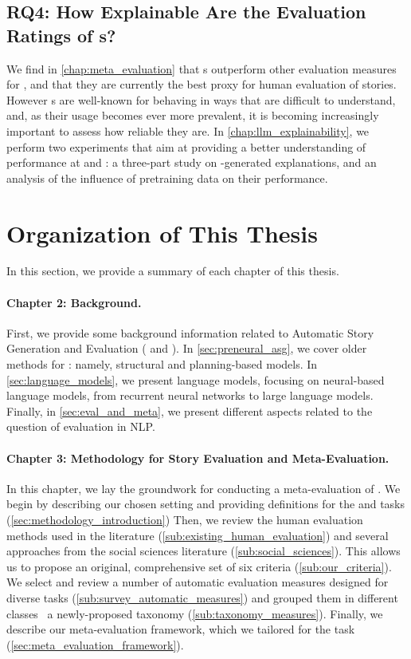 \subsection{RQ4: How Explainable Are the Evaluation Ratings of {\llmfull}s?}
We find in \autoref{chap:meta_evaluation} that {\llm}s outperform other evaluation measures for {\ase}, and that they are currently the best proxy for human evaluation of stories. However {\llm}s are well-known for behaving in ways that are difficult to understand, and, as their usage becomes ever more prevalent, it is becoming increasingly important to assess how reliable they are. In \autoref{chap:llm_explainability}, we perform two experiments that aim at providing a better understanding of {\llm} performance at {\ase} and {\asg}: a three-part study on {\llm}-generated explanations, and an analysis of the influence of pretraining data on their {\asg} performance.

\section{Organization of This Thesis}

In this section, we provide a summary of each chapter of this thesis.

\paragraph{Chapter 2: Background.}
First, we provide some background information related to Automatic Story Generation and Evaluation ({\asg} and {\ase}). In \autoref{sec:preneural_asg}, we cover older methods for {\asg}: namely, structural and planning-based models. In \autoref{sec:language_models}, we present language models, focusing on neural-based language models, from recurrent neural networks to large language models. Finally, in \autoref{sec:eval_and_meta}, we present different aspects related to the question of evaluation in NLP.

\paragraph{Chapter 3: Methodology for Story Evaluation and {\asg} Meta-Evaluation.} 
In this chapter, we lay the groundwork for conducting a meta-evaluation of {\asgfull}. We begin by describing our chosen setting and providing definitions for the {\asg} and {\ase} tasks (\autoref{sec:methodology_introduction}) Then, we review the human evaluation methods used in the {\asg} literature (\autoref{sub:existing_human_evaluation}) and several approaches from the social sciences literature (\autoref{sub:social_sciences}). This allows us to propose an original, comprehensive set of six criteria (\autoref{sub:our_criteria}). We select and review a number of automatic evaluation measures designed for diverse {\nlp} tasks (\autoref{sub:survey_automatic_measures}) and grouped them in different classes {\wrt}\ a newly-proposed taxonomy (\autoref{sub:taxonomy_measures}). Finally, we describe our meta-evaluation framework, which we tailored for the {\asg} task (\autoref{sec:meta_evaluation_framework}).

